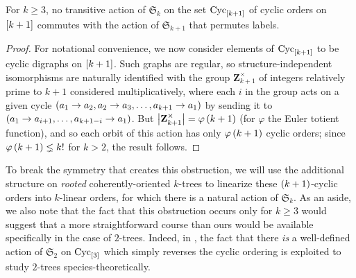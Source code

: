 \documentclass[sectionflow,singlespace,twoside]{brandiss} %
\numberwithin{section}{chapter}
\numberwithin{figure}{chapter}
\begin{document}
\begin{lemma}
  \label{lem:notransac}
  For $k \geq 3$, no transitive action of $\mathfrak{S}_{k}$ on the set $\operatorname{Cyc}_{\left[ {k+1} \right]}$ of cyclic orders on $\left[ {k+1} \right]$ commutes with the action of $\mathfrak{S}_{k+1}$ that permutes labels.
\end{lemma}
\begin{proof}
  For notational convenience, we now consider elements of $\operatorname{Cyc}_{\left[ {k+1} \right]}$ to be cyclic digraphs on $\left[ {k+1} \right]$.
  Such graphs are regular, so structure-independent isomorphisms are naturally identified with the group $\mathbf{Z}_{k+1}^{\times}$ of integers relatively prime to $k+1$ considered multiplicatively, where each $i$ in the group acts on a given cycle $\left( {a_{1} \to a_{2}, a_{2} \to a_{3}, \dots, a_{k+1} \to a_{1}} \right)$ by sending it to $\left( {a_{1} \to a_{i+1}, \dots, a_{k+1-i} \to a_{1}} \right)$.
  But $\left\vert {\mathbf{Z}_{k+1}^{\times}} \right\vert = \varphi \left( {k+1} \right)$ (for $\varphi$ the Euler totient function), and so each orbit of this action has only $\varphi \left( {k+1} \right)$ cyclic orders; since $\varphi \left( {k+1} \right) \lneq k!$ for $k > 2$, the result follows.
\end{proof}
To break the symmetry that creates this obstruction, we will use the additional structure on \emph{rooted} coherently-oriented $k$-trees to linearize these $\left( {k+1} \right)$-cyclic orders into $k$-linear orders, for which there is a natural action of $\mathfrak{S}_{k}$.
As an aside, we also note that the fact that this obstruction occurs only for $k \geq 3$ would suggest that a more straightforward course than ours would be available specifically in the case of $2$-trees.
Indeed, in \cite{gessel:spec2trees}, the fact that there \emph{is} a well-defined action of $\mathfrak{S}_{2}$ on $\operatorname{Cyc}_{\left[ {3} \right]}$ which simply reverses the cyclic ordering is exploited to study $2$-trees species-theoretically.
\end{document}
